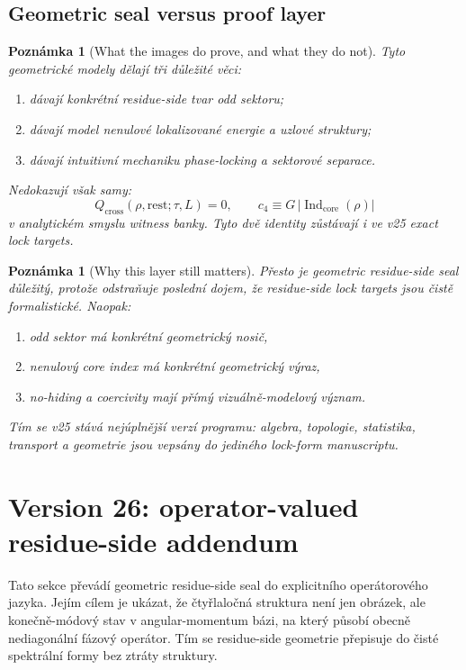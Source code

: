 \documentclass[11pt,a4paper]{article}
\newtheorem{remark}[theorem]{Poznámka}
\begin{document}
\subsection*{Geometric seal versus proof layer}

\begin{remark}[What the images do prove, and what they do not]
Tyto geometrické modely dělají tři důležité věci:
\begin{enumerate}[label=\textbf{(\arabic*)}]
    \item dávají konkrétní residue-side tvar odd sektoru;
    \item dávají model nenulové lokalizované energie a uzlové struktury;
    \item dávají intuitivní mechaniku phase-locking a sektorové separace.
\end{enumerate}
Nedokazují však samy:
\[
Q_{\mathrm{cross}}(\rho,\mathrm{rest};\tau,L)=0,
\qquad
c_4 \equiv G\,|\operatorname{Ind}_{\mathrm{core}}(\rho)|
\]
v analytickém smyslu witness banky.
Tyto dvě identity zůstávají i ve v25 exact lock targets.
\end{remark}

\begin{remark}[Why this layer still matters]
Přesto je geometric residue-side seal důležitý, protože odstraňuje poslední dojem,
že residue-side lock targets jsou čistě formalistické.
Naopak:
\begin{enumerate}[label=\textbf{(\arabic*)}]
    \item odd sektor má konkrétní geometrický nosič,
    \item nenulový core index má konkrétní geometrický výraz,
    \item no-hiding a coercivity mají přímý vizuálně-modelový význam.
\end{enumerate}
Tím se v25 stává nejúplnější verzí programu: algebra, topologie, statistika, transport a geometrie
jsou vepsány do jediného lock-form manuscriptu.
\end{remark}



\section{Version 26: operator-valued residue-side addendum}

Tato sekce převádí geometric residue-side seal do explicitního operátorového jazyka.
Jejím cílem je ukázat, že čtyřlaločná struktura není jen obrázek, ale konečně-módový stav
v angular-momentum bázi, na který působí obecně nediagonální fázový operátor.
Tím se residue-side geometrie přepisuje do čisté spektrální formy bez ztráty struktury.
\end{document}
